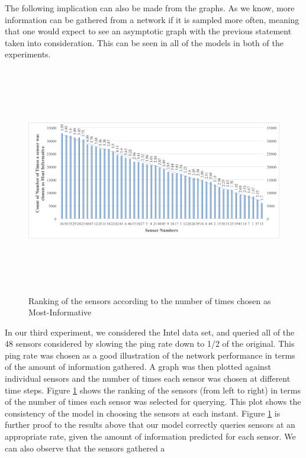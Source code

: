 The following implication can also be made from the graphs. As we
know, more information can be gathered from a network if it is sampled
more often, meaning that one would expect to see an asymptotic graph
with the previous statement taken into consideration. This can be seen
in all of the models in both of the experiments.

\begin{figure}
\begin{center}
\includegraphics[height = 100mm, width = 150mm, scale = 1]{figs/Result3}
\caption{Ranking of the sensors according to the number of times chosen as Most-Informative}
\label{most-informative}
\end{center}
\end{figure}
In our third experiment, we considered the Intel data set, and queried
all of the 48 sensors considered by slowing the ping rate down to 1/2
of the original.  This ping rate was chosen as a good illustration of
the network performance in terms of the amount of information
gathered. A graph was then plotted against individual sensors and the
number of times each sensor was chosen at different time steps. Figure
\ref{most-informative} shows the ranking of the sensors (from left to
right) in terms of the number of times each sensor was selected for
querying. This plot shows the consistency of the model in choosing the
sensors at each instant. Figure \ref{most-informative} is further
proof to the results above that our model correctly queries sensors at
an appropriate rate, given the amount of information predicted for
each sensor. We can also observe that the sensors gathered a

